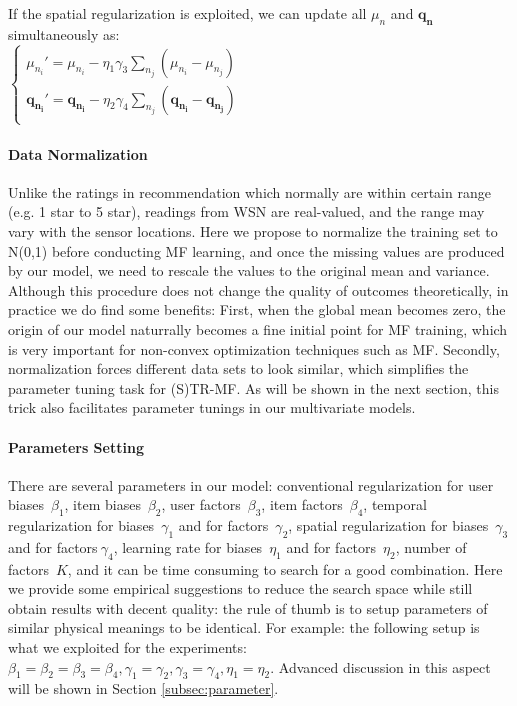If the spatial regularization is exploited, we can update all $\mu_n$ and $\mathbf{q_n}$ simultaneously as:\\
\indent $\begin{cases}
	\mu_{n_i}' = \mu_{n_i} - \eta_1 \gamma_3 \sum_{n_j}{(\mu_{n_i} - \mu_{n_j})}\\
	\mathbf{q_{n_i}}' = \mathbf{q_{n_i}} - \eta_2 \gamma_4 \sum_{n_j}{(\mathbf{q_{n_i}} - \mathbf{q_{n_j}})}\\
	\end{cases}$\\


\paragraph*{Data Normalization}

Unlike the ratings in recommendation which normally are within certain range (e.g. 1 star to 5 star), readings from WSN are real-valued, and the range may vary with the sensor locations.
Here we propose to normalize the training set to N(0,1) before conducting MF learning, and once the missing values are produced by our model, we need to rescale the values to the original mean and variance.
Although this procedure does not change the quality of outcomes theoretically, in practice we do find some benefits: 
First, when the global mean becomes zero, the origin of our model naturrally becomes a fine initial point for MF training, which is very important for non-convex optimization techniques such as MF.
Secondly, normalization forces different data sets to look similar, which simplifies the parameter tuning task for (S)TR-MF. As will be shown in the next section, this trick also facilitates parameter tunings in our multivariate models.  



\paragraph*{Parameters Setting}
There are several parameters in our model: conventional regularization for user biases~$\beta_1$, item biases~$\beta_2$, user factors~$\beta_3$, item factors~$\beta_4$, temporal regularization for biases~$\gamma_1$ and for factors~$\gamma_2$, spatial regularization for biases~$\gamma_3$ and for factors$~\gamma_4$, learning rate for biases~$\eta_1$ and for factors~$\eta_2$, number of factors~$K$, and it can be time consuming to search for a good combination. Here we provide some empirical suggestions to reduce the search space while still obtain results with decent quality: the rule of thumb is to setup parameters of similar physical meanings to be identical. For example: the following setup is what we exploited for the experiments:
$ \beta_1 = \beta_2 = \beta_3 = \beta_4, \gamma_1 = \gamma_2, \gamma_3 = \gamma_4, \eta_1 = \eta_2$. %
Advanced discussion in this aspect will be shown in Section \ref{subsec:parameter}.

